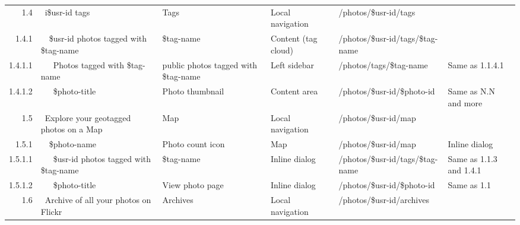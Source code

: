 \documentclass[12pt,a4paper]{article}
\begin{document}
\begin{landscape}
\begin{table}[h!b!p!]
\begin{center}
\begin{tiny}
\begin{tabular}{r|l|l|l|l|p{3cm}}
              1.4 &
              ~i\$usr-id tags &
              Tags &
              Local navigation &
              /photos/\$usr-id/tags &
              \\

                1.4.1 &
                ~~\$usr-id photos tagged with \$tag-name &
                \$tag-name &
                Content (tag cloud) &
                /photos/\$usr-id/tags/\$tag-name &
                \\

                  1.4.1.1 &
                  ~~~Photos tagged with \$tag-name &
                  public photos tagged with \$tag-name &
                  Left sidebar &
                  /photos/tags/\$tag-name &
                  Same as 1.1.4.1 \\

                  1.4.1.2 &
                  ~~~\$photo-title &
                  Photo thumbnail &
                  Content area &
                  /photos/\$usr-id/\$photo-id &
                  Same as N.N and more\\

              1.5 &
              ~Explore your geotagged photos on a Map &
              Map &
              Local navigation &
              /photos/\$usr-id/map &
              \\

                1.5.1 &
                ~~\$photo-name &
                Photo count icon &
                Map &
                /photos/\$usr-id/map &
                Inline dialog\\

                  1.5.1.1 &
                  ~~~\$usr-id photos tagged with \$tag-name &
                  \$tag-name &
                  Inline dialog &
                  /photos/\$usr-id/tags/\$tag-name &
                  Same as 1.1.3 and 1.4.1\\

                  1.5.1.2 &
                  ~~~\$photo-title &
                  View photo page &
                  Inline dialog &
                  /photos/\$usr-id/\$photo-id &
                  Same as 1.1 \\

              1.6 &
              ~Archive of all your photos on Flickr &
              Archives &
              Local navigation &
              /photos/\$usr-id/archives &
              \\


\end{tabular}
\end{tiny}
\end{center}
\end{table}
\end{landscape}
\end{document}
